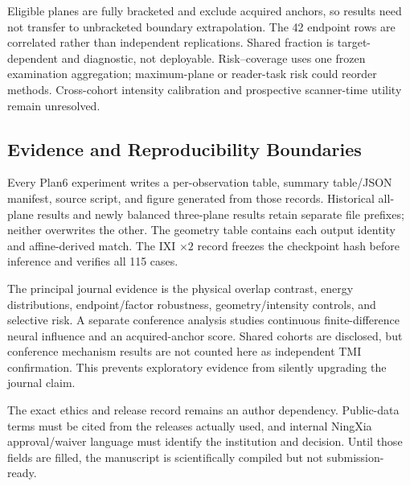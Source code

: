 \documentclass[journal,10pt]{IEEEtran}
\begin{document}
Eligible planes are fully bracketed and exclude acquired anchors, so results need not transfer to unbracketed boundary extrapolation. The 42 endpoint rows are correlated rather than independent replications. Shared fraction is target-dependent and diagnostic, not deployable. Risk--coverage uses one frozen examination aggregation; maximum-plane or reader-task risk could reorder methods. Cross-cohort intensity calibration and prospective scanner-time utility remain unresolved.

\subsection{Evidence and Reproducibility Boundaries}
Every Plan6 experiment writes a per-observation table, summary table/JSON manifest, source script, and figure generated from those records. Historical all-plane results and newly balanced three-plane results retain separate file prefixes; neither overwrites the other. The geometry table contains each output identity and affine-derived match. The IXI $\times2$ record freezes the checkpoint hash before inference and verifies all 115 cases.

The principal journal evidence is the physical overlap contrast, energy distributions, endpoint/factor robustness, geometry/intensity controls, and selective risk. A separate conference analysis studies continuous finite-difference neural influence and an acquired-anchor score. Shared cohorts are disclosed, but conference mechanism results are not counted here as independent TMI confirmation. This prevents exploratory evidence from silently upgrading the journal claim.

The exact ethics and release record remains an author dependency. Public-data terms must be cited from the releases actually used, and internal NingXia approval/waiver language must identify the institution and decision. Until those fields are filled, the manuscript is scientifically compiled but not submission-ready.
\end{document}
